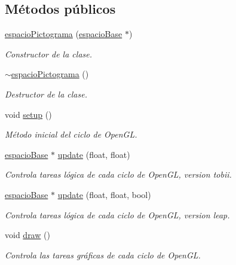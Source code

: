 \subsection*{Métodos públicos}
\begin{DoxyCompactItemize}
\item 
\hyperlink{classespacio_pictograma_a0f02bce6037dbf68a0fa644fd371d70c}{espacio\+Pictograma} (\hyperlink{classespacio_base}{espacio\+Base} $\ast$)
\begin{DoxyCompactList}\small\item\em Constructor de la clase. \end{DoxyCompactList}\item 
\hyperlink{classespacio_pictograma_a2dc94d6bc4ea2dec4d631d8bb8d8eb58}{$\sim$espacio\+Pictograma} ()
\begin{DoxyCompactList}\small\item\em Destructor de la clase. \end{DoxyCompactList}\item 
void \hyperlink{classespacio_pictograma_a88576adb5f56ddc7d2c735f349a4864d}{setup} ()
\begin{DoxyCompactList}\small\item\em Método inicial del ciclo de Open\+G\+L. \end{DoxyCompactList}\item 
\hyperlink{classespacio_base}{espacio\+Base} $\ast$ \hyperlink{classespacio_pictograma_aa6abbd78dd8a5e6e3eaa6976bc3b44ad}{update} (float, float)
\begin{DoxyCompactList}\small\item\em Controla tareas lógica de cada ciclo de Open\+G\+L, version tobii. \end{DoxyCompactList}\item 
\hyperlink{classespacio_base}{espacio\+Base} $\ast$ \hyperlink{classespacio_pictograma_a7483474fe025f26b200bbaecde989904}{update} (float, float, bool)
\begin{DoxyCompactList}\small\item\em Controla tareas lógica de cada ciclo de Open\+G\+L, version leap. \end{DoxyCompactList}\item 
void \hyperlink{classespacio_pictograma_a0f869dd16b4431009825ef13527e40db}{draw} ()
\begin{DoxyCompactList}\small\item\em Controla las tareas gráficas de cada ciclo de Open\+G\+L. \end{DoxyCompactList}\end{DoxyCompactItemize}

